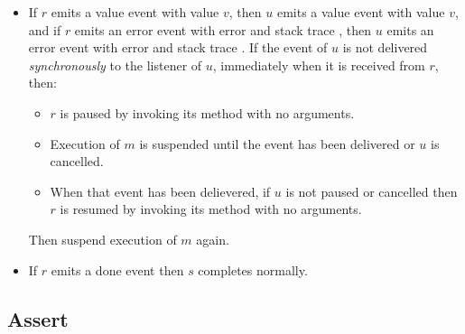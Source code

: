 \documentclass[makeidx]{article}
\begin{document}
{\begin{itemize}
\begin{itemize}
    while asynchronously delivering an event to $u$, then resume $r$
    by invoking its  method with no arguments.
    If $r$ is also paused while delivering an event, then calling 
    is allowed, as long as that call does not make $r$ stop being paused.
    Then suspend execution of $m$ again.
  \item If $r$ emits a value event with value $v$, then $u$ emits
    a value event with value $v$,
    and if $r$ emits an error event with error 
    and stack trace ,
    then $u$ emits an error event with error 
    and stack trace .
    If the event of $u$ is not delivered \emph{synchronously} to the listener
    of $u$, immediately when it is received from $r$, then:
    \begin{itemize}
      \item $r$ is paused by invoking its  method with no arguments.
      \item Execution of $m$ is suspended until the event has been delivered
         or $u$ is cancelled.
      \item When that event has been delievered, if $u$ is not paused or
         cancelled then $r$ is resumed by invoking its  method
         with no arguments. 
    \end{itemize}
    Then suspend execution of $m$ again.
  \item If $r$ emits a done event then $s$ completes normally.
  \end{itemize}
\end{itemize}


\subsection{Assert}

}
\end{document}
